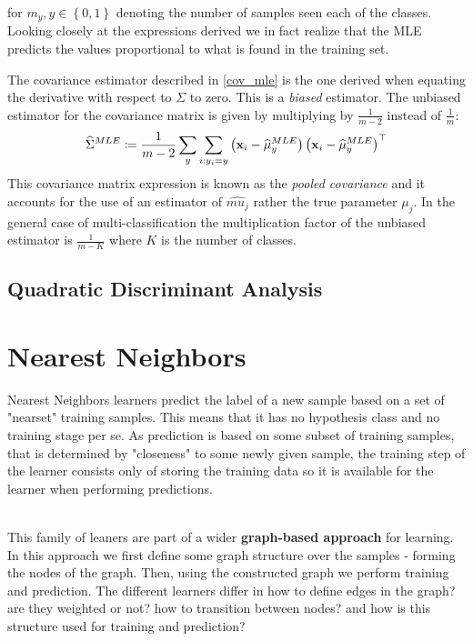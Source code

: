 for $m_y, y\in\left\{0,1\right\}$ denoting the number of samples seen each of the classes. Looking closely at the expressions derived we in fact realize that the MLE predicts the values proportional to what is found in the training set.

\begin{remark}
The covariance estimator described in \ref{cov_mle} is the one derived when equating the derivative with respect to $\Sigma$ to zero. This is a \textit{biased} estimator. The unbiased estimator for the covariance matrix is given by multiplying by $\frac{1}{m-2}$ instead of $\frac{1}{m}$:
$$ \widehat{\Sigma}^{MLE} \coloneqq \frac{1}{m-2} \sum_y \sum_{i:y_i=y}\left(\mathbf{x}_i-\widehat{\mu}_y^{MLE}\right)\left(\mathbf{x}_i-\widehat{\mu}_y^{MLE}\right)^\top$$
This covariance matrix expression is known as the \textit{pooled covariance} and it accounts for the use of an estimator of $\widehat{mu_j}$ rather the true parameter $\mu_j$. In the general case of multi-classification the multiplication factor of the unbiased estimator is $\frac{1}{m-K} $ where $K$ is the number of classes.
\end{remark}

\subsection{Quadratic Discriminant Analysis}

\section{Nearest Neighbors}
Nearest Neighbors learners predict the label of a new sample based on a set of "nearset" training samples. This means that it has no hypothesis class and no training stage per se. As prediction is based on some subset of training samples, that is determined by "closeness" to some newly given sample, the training step of the learner consists only of storing the training data so it is available for the learner when performing predictions.

~\\This family of leaners are part of a wider \textbf{graph-based approach} for learning. In this approach we first define some graph structure over the samples - forming the nodes of the graph. Then, using the constructed graph we perform training and prediction. The different learners differ in how to define edges in the graph? are they weighted or not? how to transition between nodes? and how is this structure used for training and prediction?

